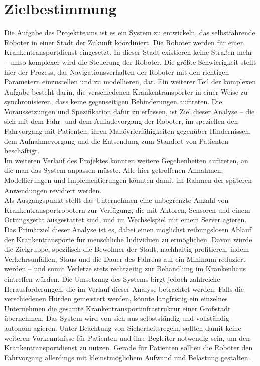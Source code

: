 
\section{Zielbestimmung}
Die Aufgabe des Projektteams ist es ein System zu entwickeln, das selbstfahrende Roboter in einer Stadt der Zukunft koordiniert. Die Roboter werden für einen Krankentransportdienst eingesetzt. In dieser Stadt existieren keine Straßen mehr – umso komplexer wird die Steuerung der Roboter. Die größte Schwierigkeit stellt hier der Prozess, das Navigationsverhalten der Roboter mit den richtigen Parametern einzustellen und zu modellieren, dar. Ein weiterer Teil der komplexen Aufgabe besteht darin, die verschiedenen Krankentransporter in einer Weise zu synchronisieren, dass keine gegenseitigen Behinderungen auftreten. Die Voraussetzungen und Spezifikation dafür zu erfassen, ist Ziel dieser Analyse – die sich mit dem Fahr- und dem Aufladevorgang der Roboter, im speziellen den Fahrvorgang mit Patienten, ihren Manövrierfähigkeiten gegenüber Hindernissen, dem Aufnahmevorgang und die Entsendung zum Standort von Patienten beschäftigt.\\

Im weiteren Verlauf des Projektes könnten weitere Gegebenheiten auftreten, an die man das System anpassen müsste. Alle hier getroffenen Annahmen, Modellierungen und Implementierungen könnten damit im Rahmen der späteren Anwendungen revidiert werden.\\

Als Ausgangspunkt stellt das Unternehmen eine unbegrenzte Anzahl von Krankentransportrobotern zur Verfügung, die mit Aktoren, Sensoren und einem Ortungsgerät ausgestattet sind, und im Wechselspiel mit einem Server agieren.\\

Das Primärziel dieser Analyse ist es, dabei einen möglichst reibungslosen Ablauf der Krankentransporte für menschliche Individuen zu ermöglichen. Davon würde die Zielgruppe, spezifisch die Bewohner der Stadt, nachhaltig profitieren, indem Verkehrsunfällen, Staus und die Dauer des Fahrens auf ein Minimum reduziert werden – und somit Verletze stets rechtzeitig zur Behandlung im Krankenhaus eintreffen würden. Die Umsetzung des Systems birgt jedoch zahlreiche Herausforderungen, die im Verlauf dieser Analyse betrachtet werden. Falls die verschiedenen Hürden gemeistert werden, könnte langfristig ein einzelnes Unternehmen die gesamte Krankentransportinfrastruktur einer Großstadt übernehmen. Das System wird von sich aus selbstständig und vollständig autonom agieren. Unter Beachtung von Sicherheitsregeln, sollten damit keine weiteren Vorkenntnisse für Patienten und ihre Begleiter notwendig sein, um den Krankentransportdienst zu nutzen. Gerade für Patienten sollten die Roboter den Fahrvorgang allerdings mit kleinstmöglichem Aufwand und Belastung gestalten.\\
